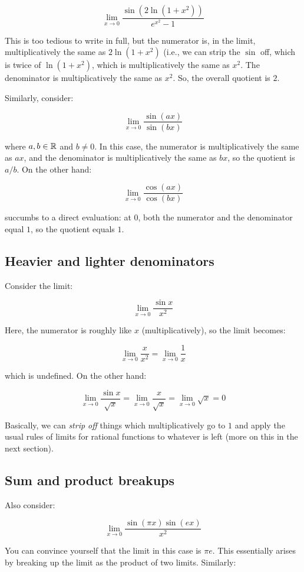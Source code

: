 \documentclass{amsart}
\begin{document}
$$\lim_{x \to 0} \frac{\sin(2\ln(1 + x^2))}{e^{x^2} - 1}$$

This is too tedious to write in full, but the numerator is, in the
limit, multiplicatively the same as $2\ln(1 + x^2)$ (i.e., we can
strip the $\sin$ off, which is twice of $\ln(1 + x^2)$, which is
multiplicatively the same as $x^2$. The denominator is
multiplicatively the same as $x^2$. So, the overall quotient is $2$.

Similarly, consider:

$$\lim_{x \to 0} \frac{\sin(ax)}{\sin(bx)}$$

where $a,b \in \mathbb{R}$ and $b \ne 0$. In this case, the numerator is
multiplicatively the same as $ax$, and the denominator is
multiplicatively the same as $bx$, so the quotient is $a/b$. On the
other hand:

$$\lim_{x \to 0} \frac{\cos(ax)}{\cos(bx)}$$

succumbs to a direct evaluation: at $0$, both the numerator and the
denominator equal $1$, so the quotient equals $1$.

\subsection{Heavier and lighter denominators}

Consider the limit:

$$\lim_{x \to 0} \frac{\sin x}{x^2}$$

Here, the numerator is roughly like $x$ (multiplicatively), so the
limit becomes:

$$\lim_{x \to 0} \frac{x}{x^2} = \lim_{x \to 0} \frac{1}{x}$$

which is undefined. On the other hand:

$$\lim_{x \to 0} \frac{\sin x}{\sqrt{x}} = \lim_{x \to 0} \frac{x}{\sqrt{x}} = \lim_{x \to 0} \sqrt{x} = 0$$

Basically, we can {\em strip off} things which multiplicatively go to
$1$ and apply the usual rules of limits for rational functions to
whatever is left (more on this in the next section).

\subsection{Sum and product breakups}

Also consider:

$$\lim_{x \to 0} \frac{\sin(\pi x) \sin(ex)}{x^2}$$

You can convince yourself that the limit in this case is $\pi e$. This
essentially arises by breaking up the limit as the product of two
limits. Similarly:
\end{document}
